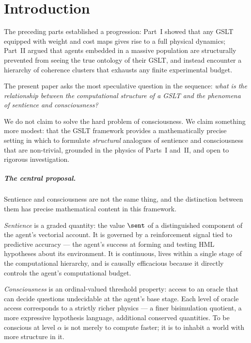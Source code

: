 \chapter{Introduction}

The preceding parts established a progression:
Part~I showed that any GSLT equipped with weight
and cost maps gives rise to a full physical dynamics;
Part~II argued that agents embedded in a massive
population are structurally prevented from seeing the true ontology
of their GSLT, and instead encounter a hierarchy of coherence
clusters that exhausts any finite experimental budget.

The present paper asks the most speculative question in the sequence:
\emph{what is the relationship between the computational structure of
a GSLT and the phenomena of sentience and consciousness?}

We do not claim to solve the hard problem of consciousness.
We claim something more modest: that the GSLT framework provides a
mathematically precise setting in which to formulate
\emph{structural} analogues of sentience and consciousness that are
non-trivial, grounded in the physics of Parts~I and~II, and
open to rigorous investigation.

\paragraph{The central proposal.}
Sentience and consciousness are not the same thing, and the
distinction between them has precise mathematical content in this
framework.

\emph{Sentience} is a graded quantity: the value $\sent$ of a
distinguished component of the agent's vectorial account.
It is governed by a reinforcement signal tied to predictive
accuracy --- the agent's success at forming and testing HML
hypotheses about its environment.
It is continuous, lives within a single stage of the computational
hierarchy, and is causally efficacious because it directly controls
the agent's computational budget.

\emph{Consciousness} is an ordinal-valued threshold property:
access to an oracle that can decide questions undecidable at the
agent's base stage.
Each level of oracle access corresponds to a strictly richer
physics --- a finer bisimulation quotient, a more expressive
hypothesis language, additional conserved quantities.
To be conscious at level $\alpha$ is not merely to compute faster;
it is to inhabit a world with more structure in it.

